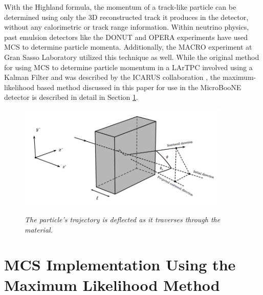 \documentclass[a4paper,11pt]{article}
\begin{document}
With the Highland formula, the momentum of a track-like particle can be determined using only the 3D reconstructed track it produces in the detector, without any calorimetric or track range information. Within neutrino physics, past emulsion detectors like the DONUT \cite{DONUT_paper} and OPERA \cite{OPERA_paper} experiments have used MCS to determine particle momenta. Additionally, the MACRO \cite{MACRO_paper} experiment at Gran Sasso Laboratory utilized this technique as well. While the original method for using MCS to determine particle momentum in a LArTPC involved using a Kalman Filter and was described by the ICARUS collaboration \cite{icarus_mcs_paper}, the maximum-likelihood based method discussed in this paper for use in the MicroBooNE detector is described in detail in Section \ref{MCS_technique_section}.


\begin{figure}[ht!]
\centering
	\includegraphics[width=0.9\textwidth]{Figures/static_figs/mcs_nocap.png} \\
\caption{\textit{The particle's trajectory is deflected as it traverses through the material.}}\label{mcs_nocap_fig}
\end{figure}

























\section{MCS Implementation Using the Maximum Likelihood Method}\label{MCS_technique_section}
\end{document}
